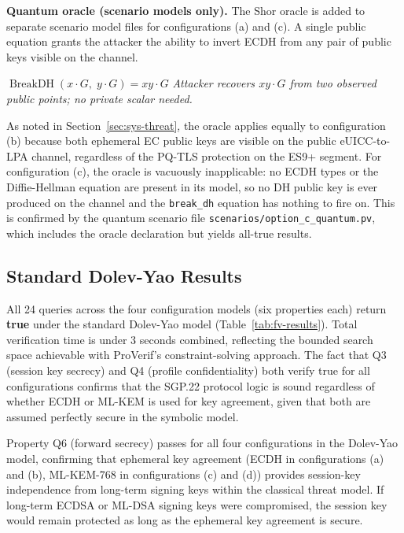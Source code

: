 \documentclass[a4paper,fleqn]{cas-sc}
\begin{document}
\noindent\textbf{Quantum oracle (scenario models only).} The Shor oracle
is added to separate scenario model files for configurations (a) and (c).
A single public equation grants the attacker the ability to invert ECDH
from any pair of public keys visible on the channel.

\begin{algorithm}[H]
\caption{Shor oracle (quantum scenario models only)}
\footnotesize
\begin{algorithmic}[1]
\State $\operatorname{BreakDH}(x{\cdot}G,\;y{\cdot}G)=xy{\cdot}G$
\Statex \textit{Attacker recovers $xy{\cdot}G$ from two observed public points; no private scalar needed.}
\end{algorithmic}
\end{algorithm}

As noted in Section~\ref{sec:sys-threat}, the oracle applies equally to
configuration (b) because both ephemeral EC public keys are visible on
the public eUICC-to-LPA channel, regardless of the PQ-TLS protection
on the ES9+ segment. For configuration (c), the oracle is vacuously
inapplicable: no ECDH types or the Diffie-Hellman equation are present
in its model, so no DH public key is ever produced on the channel and
the \texttt{break\_dh} equation has nothing to fire on. This is confirmed
by the quantum scenario file \texttt{scenarios/option\_c\_quantum.pv},
which includes the oracle declaration but yields all-true results.

\subsection{Standard Dolev-Yao Results}
\label{sec:fv-dy}

All 24 queries across the four configuration models (six properties each)
return \textbf{true} under the standard Dolev-Yao model
(Table~\ref{tab:fv-results}). Total verification time is under 3 seconds
combined, reflecting the bounded search space achievable with ProVerif's
constraint-solving approach. The fact that Q3 (session key secrecy) and
Q4 (profile confidentiality) both verify true for all configurations
confirms that the SGP.22 protocol logic is sound regardless of whether
ECDH or ML-KEM is used for key agreement, given that both are assumed
perfectly secure in the symbolic model.

Property Q6 (forward secrecy) passes for all four configurations in the
Dolev-Yao model, confirming that ephemeral key agreement (ECDH in
configurations (a) and (b), ML-KEM-768 in configurations (c) and (d))
provides session-key independence from long-term signing keys within the
classical threat model. If long-term ECDSA or ML-DSA signing keys were
compromised, the session key would remain protected as long as the
ephemeral key agreement is secure.
\end{document}
